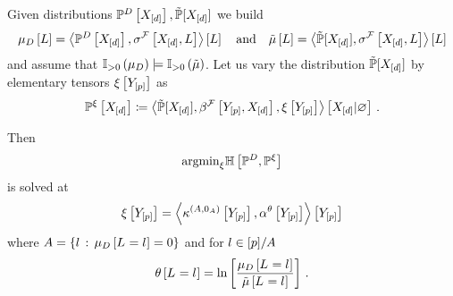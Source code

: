 \begin{lemma}
    Given distributions $\mathbb{P}^{D}\left[X_{[d]}\right],\tilde{\mathbb{P}}[X_{[d]}]$ we build
    \begin{align*}
        \mu_{D}\left[L\right] = \left\langle \mathbb{P}^{D}\left[X_{[d]}\right],\sigma^{\mathcal{F}}\left[X_{[d]},L\right]\right\rangle \left[ L \right]
        \quad\text{and}\quad
        \tilde{\mu}\left[L\right] = \left\langle \tilde{\mathbb{P}}[X_{[d]}],\sigma^{\mathcal{F}}\left[X_{[d]},L\right]\right\rangle \left[ L \right]
    \end{align*}
    and assume that $\mathbb{I}_{>0}\left(\mu_{D}\right)\models\mathbb{I}_{>0}\left(\tilde{\mu}\right)$. %
    Let us vary the distribution $\tilde{\mathbb{P}}[X_{[d]}]$ by elementary tensors $\xi\left[Y_{[p]}\right]$ as
    \begin{align*} %
        \probofat{\acttensor}{\shortcatvariables}
        \coloneqq \normalizationof{\secprobwith,\hlnstatccwith,\acttensorat{\headvariables}}{\shortcatvariables} \, .
    \end{align*}

    Then
    \begin{align*}
        \mathrm{argmin}_{\xi} \mathbb{H}\left[\mathbb{P}^{D},\mathbb{P}^{\xi}\right]
    \end{align*}
    is solved at
    \begin{align*}
        \xi\left[Y_{[p]}\right]
        = \left\langle \kappa^{(A,0_{A})}\left[Y_{[p]}\right],\alpha^\theta\left[Y_{[p]}\right]\right\rangle \left[ Y_{[p]} \right]
    \end{align*}
    where $A=\{l\,:\,\mu_{D}\left[L_{}=l_{}\right]=0\}$ and for $l\in[p]/A$
    \begin{align*}
        \theta\left[L_{}=l_{}\right] = \ln \left[ \frac{\mu_{D}\left[L_{}=l_{}\right]}{\tilde{\mu}\left[L_{}=l_{}\right]} \right] \, .
    \end{align*}
\end{lemma}
